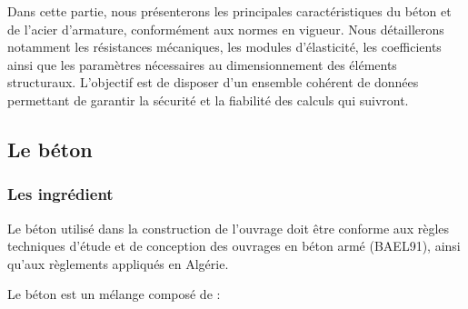 \documentclass[12pt,a4paper]{report}
\numberwithin{equation}{section}
\begin{document}
	\vspace{\baselineskip}
	
	Dans cette partie, nous présenterons les principales caractéristiques du béton et de l’acier d’armature, conformément aux normes en vigueur. Nous détaillerons notamment les résistances mécaniques, les modules d’élasticité, les coefficients ainsi que les paramètres nécessaires au dimensionnement des éléments structuraux. L’objectif est de disposer d’un ensemble cohérent de données permettant de garantir la sécurité et la fiabilité des calculs qui suivront.
	
	\subsection{Le béton}
	
	\subsubsection{Les ingrédient}
	
	Le béton utilisé dans la construction de l'ouvrage doit être conforme aux règles techniques d'étude et de conception des ouvrages en béton armé (BAEL91), ainsi qu'aux règlements appliqués en Algérie.
	
	Le béton est un mélange composé de :
	
\end{document}
